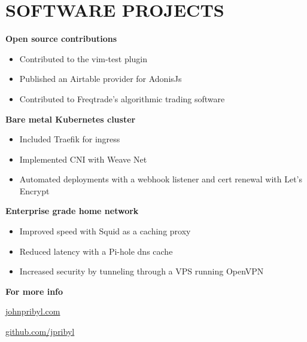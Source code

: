 \documentclass[12pt]{resume}
\begin{document}
    \begin{minipage}[t]{0.369\textwidth}
        {\section* {SOFTWARE PROJECTS}}
        \vspace{.5em}

        {\bf Open source contributions}
        \vspace{.7em}
        \begin{itemize}
            \setlength\itemsep{-.2em}
            \item {Contributed to the vim-test plugin}
            \item {Published an Airtable provider for AdonisJs}
            \item {Contributed to Freqtrade's algorithmic trading software}
        \end{itemize}

        {\bf Bare metal Kubernetes cluster}
        \begin{itemize}
            \setlength\itemsep{-.2em}
            \item {Included Traefik for ingress}
            \item {Implemented CNI with Weave Net}
            \item {Automated deployments with a webhook listener and cert renewal with Let's Encrypt}
        \end{itemize}


        {\bf Enterprise grade home network}
        \begin{itemize}
            \setlength\itemsep{-.2em}
            \item {Improved speed with Squid as a caching proxy}
            \item {Reduced latency with a Pi-hole dns cache}
            \item {Increased security by tunneling through a VPS running OpenVPN}
        \end{itemize}

        {\bf For more info}
        \vspace{.7em}
        {\par \textcolor{lavender}{\faGlobe\hspace{.5em}\underline{\href{http://www.johnpribyl.com}{johnpribyl.com}}}}
        {\par \textcolor{lavender}{\faGithub\hspace{.5em}\underline{\href{http://www.github.com/jpribyl}{github.com/jpribyl}}}}


\end{minipage}
\end{document}

